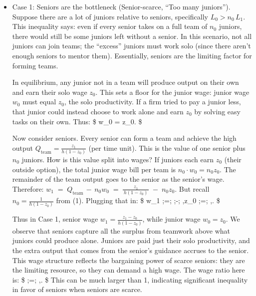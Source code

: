\documentclass[12pt]{article}
\begin{document}
\begin{itemize}
\item
  {Case 1: Seniors are the bottleneck (Senior-scarce, ``Too many
  juniors'').} Suppose there are a lot of juniors relative to seniors,
  specifically \(L_0 > n_0 \,L_1\). This inequality says: even if every
  senior takes on a full team of \(n_0\) juniors, there would still be
  some juniors left without a senior. In this scenario, {not all
  juniors can join teams}; the ``excess'' juniors must work solo (since
  there aren't enough seniors to mentor them). Essentially, seniors are
  the limiting factor for forming teams.

  In equilibrium, any junior {not} in a team will produce output on
  their own and earn their solo wage \(z_0\). This sets a floor for the
  junior wage: {junior wage \(w_0\) must equal \(z_0\)}, the solo
  productivity. If a firm tried to pay a junior less, that junior could
  instead choose to work alone and earn \(z_0\) by solving easy tasks on
  their own. Thus: \$ w\_0 = z\_0. \$

  Now consider seniors. Every senior can form a team and achieve the
  high output \(Q_{\text{team}} = \frac{z_1}{h(1-z_0)}\) (per time
  unit). This is the {value of one senior plus \(n_0\) juniors}.
  How is this value split into wages? If juniors each earn \(z_0\)
  (their outside option), the total junior wage bill per team is
  \(n_0 \cdot w_0 = n_0 z_0\). The remainder of the team output goes to
  the senior as the senior's wage. Therefore:
  \(w_1 \;=\; Q_{\text{team}} \,-\, n_0 w_0 \;=\; \frac{z_1}{\,h(1-z_0)\,} \;-\; n_0 z_0.\)
  But recall \(n_0 = \frac{1}{h(1-z_0)}\) from (1). Plugging that in: \$
  w\_1 ;=;  ;-;  ,z\_0 ;=;
  ,. \$

  Thus in Case 1, {senior wage}
  \(w_1 = \frac{z_1 - z_0}{h(1-z_0)}\), while {junior wage}
  \(w_0 = z_0\). We observe that seniors capture all the {surplus}
  from teamwork above what juniors could produce alone. Juniors are paid
  just their solo productivity, and the extra output that comes from the
  senior's guidance accrues to the senior. This wage structure reflects
  the {bargaining power of scarce seniors}: they are the limiting
  resource, so they can demand a high wage. The {wage ratio} here
  is: \$  ;=; ,.
  \$ This can be much larger than 1, indicating significant
  inequality in favor of seniors when seniors are scarce.


\end{itemize}
\end{document}
